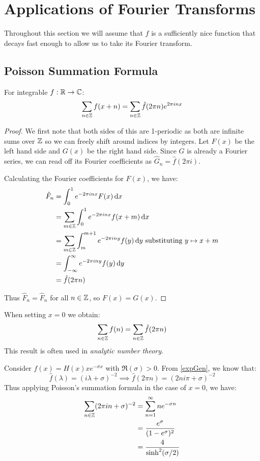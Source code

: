 \documentclass[../main.tex]{subfiles}
\begin{document}
\section{Applications of Fourier Transforms}
\begin{remark}[Note]
  Throughout this section we will assume that $f$ is a sufficiently nice function that decays fast enough to allow us to take its Fourier transform.
\end{remark}
\subsection{Poisson Summation Formula}
\begin{proposition}
  For integrable $f: \mathbb{R} \to \mathbb{C}$:
  \[
    \sum_{n \in \mathbb{Z}} f(x + n) = \sum_{n \in \mathbb{Z}} \hat{f}(2\pi n) e^{2\pi i n x}
  \]
\end{proposition}
\begin{proof}
  We first note that both sides of this are 1-periodic as both are infinite sums over $\mathbb{Z}$ so we can freely shift around indices by integers.
  Let $F(x)$ be the left hand side and $G(x)$ be the right hand side.
  Since $G$ is already a Fourier series, we can read off its Fourier coefficients as $\hat{G}_n = \hat{f}(2\pi i)$.

  Calculating the Fourier coefficients for $F(x)$, we have:
  \begin{align*}
    \hat{F}_n &= \int_{0}^{1} e^{-2\pi i n x} F(x) \d{x} \\
              &= \sum_{m \in \Z} \int_{0}^{1} e^{-2 \pi i n x} f(x + m) \d{x} \\
              &= \sum_{m  \in \Z} \int_{m}^{m + 1} e^{-2\pi i n y} f(y) \d{y} \text{ substituting $y \mapsto x + m$} \\
              &= \int_{-\infty}^{\infty} e^{-2\pi i n y} f(y) \d{y} \\
              &= \hat{f}(2 \pi n)
  \end{align*}

  Thus $\hat{F}_n = \hat{F}_n$ for all $n \in \mathbb{Z}$, so $F(x) = G(x)$.
\end{proof}
\begin{remark}
  When setting $x = 0$ we obtain:
  \[
    \sum_{n \in \mathbb{Z}} f(n) = \sum_{n \in \mathbb{Z}} \hat{f}(2 \pi n)
  \]
  This result is often used in \textit{analytic number theory}.
\end{remark}
\begin{example}
  Consider $f(x) = H(x) x e^{-\sigma x}$ with $\Re(\sigma) > 0$.
  From \cref{expGen}, we know that:
  \[
    \hat{f}(\lambda) = (i \lambda + \sigma)^{-2} \implies \hat{f}(2\pi n) = (2ni\pi + \sigma)^{-2}
  \]
  Thus applying Poisson's summation formula in the case of $x = 0$, we have:
  \begin{align*}
    \sum_{n \in \mathbb{Z}} (2 \pi i n + \sigma)^{-2} & = \sum_{n = 1}^{\infty} n e^{-\sigma n} \\
                                              &= \frac{e^{\sigma}}{(1 - e^{\sigma})^2} \\
                                              &= \frac{4}{\sinh^2(\sigma/2)}
  \end{align*}
\end{example}
\end{document}
